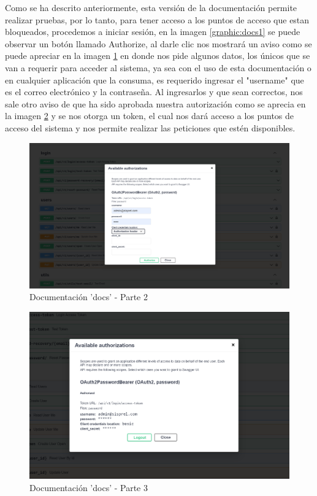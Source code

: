 Como se ha descrito anteriormente, esta versión de la documentación permite realizar pruebas, por lo tanto, para tener acceso a los puntos de acceso que estan bloqueados, procedemos a iniciar sesión, en la imagen \ref{graphic:docs1} se puede observar un botón llamado Authorize, al darle clic nos mostrará un aviso como se puede apreciar en la imagen \ref{graphic:docs2} en donde nos pide algunos datos, los únicos que se van a requerir para acceder al sistema, ya sea con el uso de esta documentación o en cualquier aplicación que la consuma, es requerido ingresar el "username" que es el correo electrónico y la contraseña. Al ingresarlos y que sean correctos, nos sale otro aviso de que ha sido aprobada nuestra autorización  como se aprecia en la imagen \ref{graphic:docs3} y se nos otorga un token, el cual nos dará acceso a los puntos de acceso del sistema y nos permite realizar las peticiones que estén disponibles.

\begin{figure}[!htb]
    \centering
    \includegraphics[scale=.20]{TT/img/implementacion/docs_2.png}
    \caption{Documentación 'docs' - Parte 2}
    \label{graphic:docs2}    
\end{figure}

\begin{figure}[!htb]
    \centering
    \includegraphics[scale=.30]{TT/img/implementacion/docs_3.png}
    \caption{Documentación 'docs' - Parte 3}
    \label{graphic:docs3}
\end{figure}


